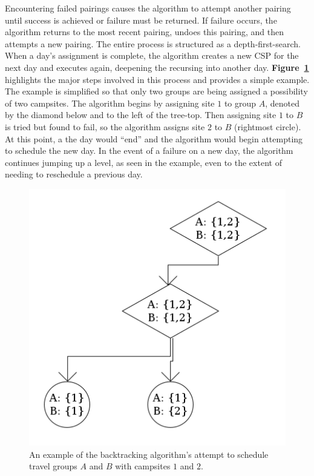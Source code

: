 \documentclass[11pt]{article} %
\begin{document}
Encountering failed pairings causes the algorithm to attempt another pairing
until success is achieved or failure must be returned.  If failure occurs,
the algorithm returns to the most recent pairing, undoes this pairing, and
then attempts a new pairing.  The entire process is structured as a
depth-first-search. When a day's assignment is complete, the algorithm creates
a new CSP for the next day and executes again, deepening the recursing into
another day.  \textbf{Figure~\ref{fig:searchExample}} highlights the major steps
involved in this process and provides a simple example.  The example is
simplified so that only two groups are being assigned a possibility of two
campsites.  The algorithm begins by assigning site $1$ to group $A$, denoted
by the diamond below and to the left of the tree-top.  Then assigning
site $1$ to $B$ is tried but found to fail, so the algorithm assigns site
$2$ to $B$ (rightmost circle).  At this point, a the day would ``end'' and
the algorithm would begin attempting to schedule the new day.  In the event
of a failure on a new day, the algorithm continues jumping up a level, as
seen in the example, even to the extent of needing to reschedule a previous
day.

\begin{figure}[h]
  \centering
  \includegraphics[scale=0.5]{imgs/searchExample.png}
  \caption{An example of the backtracking algorithm's attempt to schedule
    travel groups $A$ and $B$ with campsites $1$ and $2$.}
  \label{fig:searchExample}
\end{figure}
\end{document}
